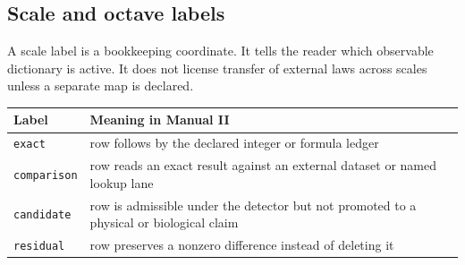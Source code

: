 
\subsection{Scale and octave labels}

A scale label is a bookkeeping coordinate. It tells the reader which observable dictionary is active. It does not license transfer of external laws across scales unless a separate map is declared.

\begin{center}
\begin{tabularx}{\linewidth}{@{}lX@{}}
\toprule
Label & Meaning in Manual II \\
\midrule
\texttt{exact} & row follows by the declared integer or formula ledger \\
\texttt{comparison} & row reads an exact result against an external dataset or named lookup lane \\
\texttt{candidate} & row is admissible under the detector but not promoted to a physical or biological claim \\
\texttt{residual} & row preserves a nonzero difference instead of deleting it \\
\bottomrule
\end{tabularx}
\end{center}
